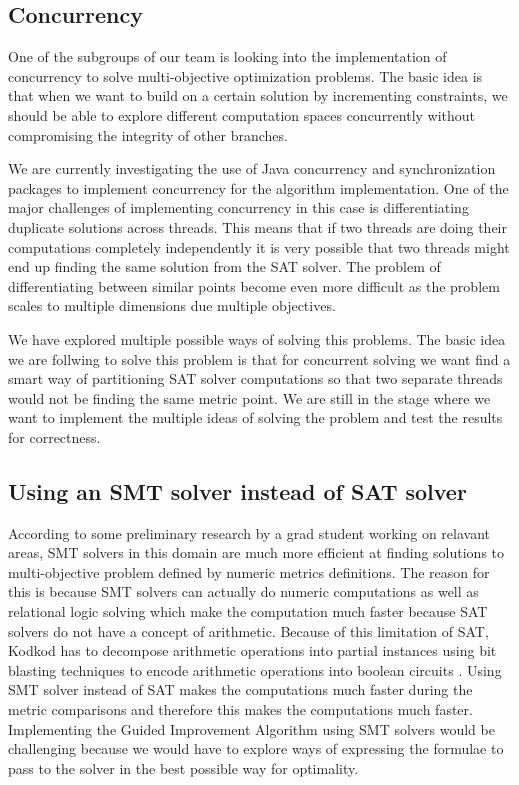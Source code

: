 \documentclass[11pt]{article}
\theoremstyle{definition}
\begin{document}
\subsection{Concurrency}
One of the subgroups of our team is looking into the implementation of concurrency to solve multi-objective optimization problems. The basic idea is that when we want to build on a certain solution by incrementing constraints, we should be able to explore different computation spaces concurrently without compromising the integrity of other branches.

We are currently investigating the use of Java concurrency and synchronization packages to implement concurrency for the algorithm implementation. One of the major challenges of implementing concurrency in this case is differentiating duplicate solutions across threads. This means that if two threads are doing their computations completely independently it is very possible that two threads might end up finding the same solution from the SAT solver. The problem of differentiating between similar points become even more difficult as the problem scales to multiple dimensions due multiple objectives.

We have explored multiple possible ways of solving this problems. The basic idea we are follwing to solve this problem is that for concurrent solving we want find a smart way of partitioning SAT solver computations so that two separate threads would not be finding the same metric point. We are still in the stage where we want to implement the multiple ideas of solving the problem and test the results for correctness.

\subsection{Using an SMT solver instead of SAT solver}
According to some preliminary research by a grad student working on relavant areas, SMT solvers in this domain are much more efficient at finding solutions to multi-objective problem defined by numeric metrics definitions. The reason for this is because SMT solvers can actually do numeric computations as well as relational logic solving which make the computation much faster because SAT solvers do not have a concept of arithmetic. Because of this limitation of SAT, Kodkod has to decompose arithmetic operations into partial instances using bit blasting techniques to encode arithmetic operations into boolean circuits \cite{ref:bitblasting}. Using SMT solver instead of SAT makes the computations much faster during the metric comparisons and therefore this makes the computations much faster. Implementing the Guided Improvement Algorithm using SMT solvers would be challenging because we would have to explore ways of expressing the formulae to pass to the solver in the best possible way for optimality.
\end{document}
